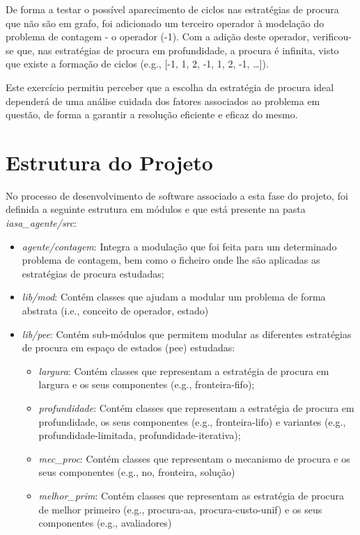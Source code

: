 De forma a testar o possível aparecimento de ciclos nas estratégias de procura que não são em grafo, foi adicionado um terceiro operador à modelação do problema de contagem - o operador (-1).
Com a adição deste operador, verificou-se que, nas estratégias de procura em profundidade, a procura é infinita, visto que existe a formação de ciclos (e.g., [-1, 1, 2, -1, 1, 2, -1, \ldots]).

Este exercício permitiu perceber que a escolha da estratégia de procura ideal dependerá de uma análise cuidada dos fatores associados ao problema em questão, de forma a garantir a resolução eficiente e eficaz do mesmo.


\section{Estrutura do Projeto}\label{sec:estrutura-do-projeto-3}

No processo de desenvolvimento de software associado a esta fase do projeto, foi definida a seguinte estrutura em módulos e que está presente na pasta \textit{iasa\_agente/src}:

\begin{itemize}
    \item \textit{agente/contagem}: Integra a modulação que foi feita para um determinado problema de contagem, bem como o ficheiro onde lhe são aplicadas as estratégias de procura estudadas;
    \item \textit{lib/mod}: Contém classes que ajudam a modular um problema de forma abstrata (i.e., conceito de operador, estado)
    \item \textit{lib/pee}: Contém sub-módulos que permitem modular as diferentes estratégias de procura em espaço de estados (pee) estudadas:
    \begin{itemize}
        \item \textit{largura}: Contém classes que representam a estratégia de procura em largura e os seus componentes (e.g., fronteira-fifo);
        \item \textit{profundidade}: Contém classes que representam a estratégia de procura em profundidade, os seus componentes (e.g., fronteira-lifo) e variantes (e.g., profundidade-limitada, profundidade-iterativa);
        \item \textit{mec\_proc}: Contém classes que representam o mecanismo de procura e os seus componentes (e.g., no, fronteira, solução)
        \item \textit{melhor\_prim}: Contém classes que representam as estratégia de procura de melhor primeiro (e.g., procura-aa, procura-custo-unif) e os seus componentes (e.g., avaliadores)
    \end{itemize}
\end{itemize}
